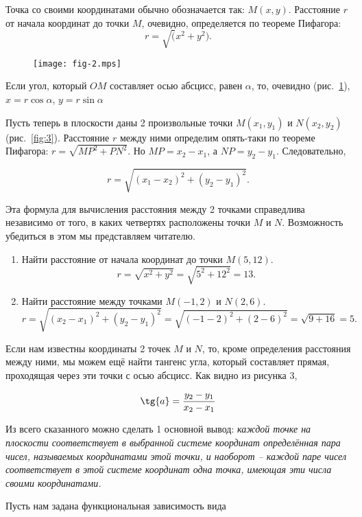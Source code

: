 Точка со своими координатами обычно обозначается так: $M(x,y)$. Расстояние $r$
от начала координат до точки $M$, очевидно, определяется по теореме Пифагора:
$$r = \sqrt(x^2 + y^2).$$

\begin{figure}
	\texttt{[image: fig-2.mps]}
	\centering
	\caption{}
	\label{fig:2}
\end{figure}

Если угол, который $OM$ составляет осью абсцисс, равен $\alpha$, то, очевидно
(рис.~\ref{fig:2}), $x = r \cos{\alpha}$, $y = r \sin{\alpha}$

Пусть теперь в плоскости даны 2 произвольные точки $M(x_1, y_1)$ и $N(x_2,
y_2)$ (рис.~\ref{fig:3}). Расстояние $r$ между ними определим опять-таки по
теореме Пифагора: $r = \sqrt{MP^2 + PN^2}$. Но $MP = x_2 - x_1$, а $NP = y_2 -
y_1$. Следовательно,

$$r = \sqrt{(x_1 - x_2)^2 + (y_2 - y_1)^2}.$$

Эта формула для вычисления расстояния между 2 точками справедлива независимо от
того, в каких четвертях расположены точки $M$ и $N$. Возможность убедиться в
этом мы представляем читателю.

\begin{example}[Примеры]
	\begin{enumerate}
		\item Найти расстояние от начала координат до точки $M(5,12)$.
			$$r = \sqrt{x^2 + y^2} = \sqrt{5^2 + 12^2} = 13.$$
		\item Найти расстояние между точками $M(-1,2)$ и $N(2,6)$.
			$$r = \sqrt{(x_2 - x_1)^2 + (y_2 - y_1)^2} =
			\sqrt{(-1-2)^2 + (2 - 6)^2} = \sqrt{9 + 16} = 5.$$
	\end{enumerate}
\end{example}

Если нам известны координаты 2 точек $M$ и $N$, то, кроме определения
расстояния между ними, мы можем ещё найти тангенс угла, который составляет
прямая, проходящая через эти точки с осью абсцисс. Как видно из рисунка 3,

$$\tg{a} = \frac{y_2 - y_1}{x_2 - x_1}$$

Из всего сказанного можно сделать 1 основной вывод: \textit{каждой точке на
плоскости соответствует в выбранной системе координат определённая пара чисел,
называемых координатами этой точки, и наоборот -- каждой паре чисел
соответствует в этой системе координат одна точка, имеющая эти числа своими
координатами.}

Пусть нам задана функциональная зависимость вида

